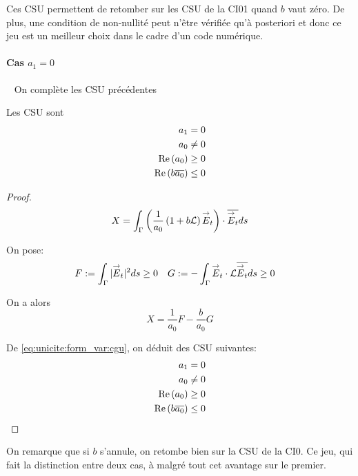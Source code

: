         Ces CSU permettent de retomber sur les CSU de la CI01 quand \(b\) vaut zéro. De plus, une condition de non-nullité peut n'être vérifiée qu'à posteriori et donc ce jeu est un meilleur choix dans le cadre d'un code numérique.

      \paragraph{Cas \(a_1=0\)}
        ~
        On complète les CSU précédentes
        \begin{prop}
          Les CSU sont
          \begin{align}
            a_1 = 0 \\
            a_0 \not= 0\\
            \operatorname{Re}\left(a_0\right) \ge 0\\
            \operatorname{Re}\left(b{\overline{a_0}}\right) \le 0
          \end{align}
        \end{prop}
        \begin{proof}
          \[
            X = \int_\Gamma \left( \dfrac{1}{a_0}\left(1+b\mathcal{L}\right){\overset{\rightarrow}{E}}_t\right) \cdot {\overline{{\overset{\rightarrow}{E}}_t}} ds
          \]

          On pose:
          \begin{align*}
            F&:= \int_\Gamma | {\overset{\rightarrow}{E}}_t | ^2 ds \ge 0 & G &:= -\int_\Gamma {\overset{\rightarrow}{E}}_t \cdot \mathcal{L}{\overline{{\overset{\rightarrow}{E}}_t}} ds \ge 0
          \end{align*}

          On a alors
          \begin{equation}
            \label{eq:unicite:form_var:decomp_cgu_ci1_a1_nul}
            X = \frac{1}{a_0}F - \frac{b}{a_0}G
          \end{equation}

          De \eqref{eq:unicite:form_var:cgu}, on déduit des CSU suivantes:
          \begin{align}
            a_1 = 0 \\
            a_0 \not= 0\\
            \operatorname{Re}\left(a_0\right) \ge 0\\
            \operatorname{Re}\left(b{\overline{a_0}}\right) \le 0
          \end{align}
        \end{proof}

        On remarque que si \(b\) s’annule, on retombe bien sur la CSU de la CI0. Ce jeu, qui fait la distinction entre deux cas, à malgré tout cet avantage sur le premier.
